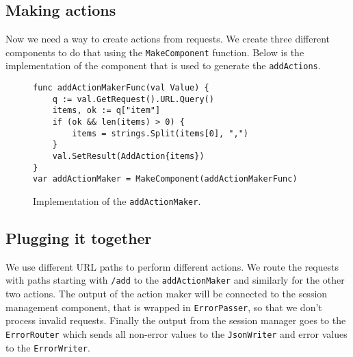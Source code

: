\subsection{Making actions}
Now we need a way to create actions from requests. We create three different
components to do that using the \texttt{MakeComponent} function. Below
is the implementation of the component that is used to generate 
the \texttt{addActions}.
\begin{figure}[h]
\begin{lstlisting}
func addActionMakerFunc(val Value) {
    q := val.GetRequest().URL.Query()
    items, ok := q["item"]
    if (ok && len(items) > 0) {
        items = strings.Split(items[0], ",")
    }
    val.SetResult(AddAction{items})
}
var addActionMaker = MakeComponent(addActionMakerFunc) 
\end{lstlisting}
\caption[scale=1.0]{Implementation of the \texttt{addActionMaker}.}
\label{fig:addActionMaker}
\end{figure}

\newpage
\subsection{Plugging it together}
We use different URL paths to perform different actions. We route the 
requests with paths starting with \texttt{/add} to the \texttt{addActionMaker}
and similarly for the other two actions. The output of the action maker
will be connected to the session management component, that is wrapped in
\texttt{ErrorPasser}, so that we don't process invalid requests.
Finally the output from the session manager goes to the \texttt{ErrorRouter}
which sends all non-error values to the \texttt{JsonWriter} and error
values to the \texttt{ErrorWriter}. 

